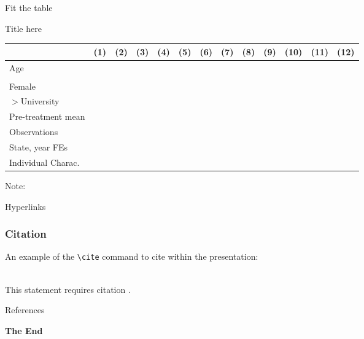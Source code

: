 \documentclass[aspectratio=169,xcolor=dvipsnames]{beamer}
\begin{document}
\begin{frame}{Fit the table}

\begin{center}
\def\sym#1{\ifmmode^{#1}\else\(^{#1}\)\fi}
\caption{Title here}
\begin{tabular}{l*{12}{c}}
\hline\hline
                &(1) & (2) & (3) & (4) & (5) & (6) &(7) & (8) & (9) & (10) & (11) & (12)\\
\hline
Age             & &  & &   &   &   &  &  &  & & & \\
                 & &  & &   &   &   &  & &  & & &  \\
Female             & &  & &   &   &   &  & &  & & &  \\
$>$University             & &  & &   &   &   &  &&  & & &   \\
\hline
Pre-treatment mean      & &  & &   &   &   &  & &  & & &  \\
Observations         & &  & &   &   &   &  & &  & & &  \\
\hline
State, year FEs       & &  & &   &   &   &  & &  & & &  \\
Individual Charac.       & &  & &   &   &   &  & &  & & &  \\
\hline\hline
\end{tabular} 
\end{center}
\scriptsize Note: 
\end{frame}


\begin{frame}{Hyperlinks}
\label{link}

\hyperlink{figure}{}

\end{frame}


\begin{frame}[fragile] %
    \frametitle{Citation}
    An example of the \verb|\cite| command to cite within the presentation:\\~

    This statement requires citation \cite{p1}.
\end{frame}


\begin{frame}{References}
    \footnotesize
    
    
\end{frame}


\begin{frame}
    \Huge{\centerline{\textbf{The End}}}
\end{frame}

\end{document}
